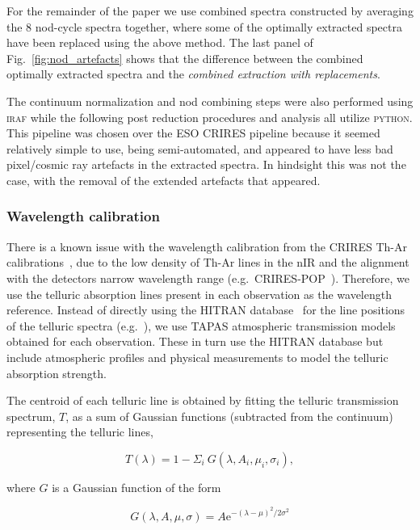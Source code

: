 \documentclass[fleqn,usenatbib]{mnras}
\begin{document}
For the remainder of the paper we use combined spectra constructed by averaging the 8 nod-cycle spectra together, where some of the optimally extracted spectra have been replaced using the above method. The last panel of Fig.~\ref{fig:nod_artefacts} shows that the difference between the combined optimally extracted spectra and the \emph{combined extraction with replacements}.

The continuum normalization and nod combining steps were also performed using \textsc{iraf} while the following post reduction procedures and analysis all utilize \textsc{python}. This pipeline was chosen over the ESO CRIRES pipeline because it seemed relatively simple to use, being semi-automated, and appeared to have less bad pixel/cosmic ray artefacts in the extracted spectra. In hindsight this was not the case, with the removal of the extended artefacts that appeared.

\subsubsection{Wavelength calibration}
\label{subsec:wave_cal}
There is a known issue with the wavelength calibration from the CRIRES Th-Ar calibrations~\citep{kerber_laboratory_2009}, due to the low density of Th-Ar lines in the nIR and the alignment with the detectors narrow wavelength range (e.g.\ CRIRES-POP~\citep{nicholls_crirespop_2017}).
Therefore, we use the telluric absorption lines present in each observation as the wavelength reference. Instead of directly using the HITRAN database~\citep{rothman_hitran2012_2013} for the line positions of the telluric spectra (e.g.~\citep{brogi_signature_2012,brogi_carbon_2014,dekok_detection_2013}), we use TAPAS atmospheric transmission models~\citep{bertaux_tapas_2014} obtained for each observation. These in turn use the HITRAN database but include atmospheric profiles and physical measurements to model the telluric absorption strength.

The centroid of each telluric line is obtained by fitting the telluric transmission spectrum, \(T\), as a sum of Gaussian functions (subtracted from the continuum) representing the telluric lines,

\begin{equation}
T(\lambda) = 1 - {\Sigma}_{i}\ G(\lambda, A_{i}, {\mu}_{i}, {\sigma}_{i}),
\end{equation}

where \(G\) is a Gaussian function of the form

\begin{equation}
G(\lambda, A, \mu, \sigma) = {A \textrm{e}}^{{-(\lambda-\mu)}^{2}/2\sigma^{2}}
\end{equation}
\end{document}
